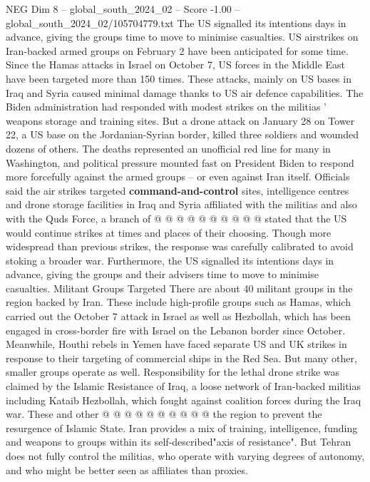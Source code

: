 \begin{textsample}{NEG Dim 8 – global\_south\_2024\_02 – Score -1.00 – global\_south\_2024\_02/105704779.txt}  \label{ex:f8_neg_063}
The US signalled its intentions days in advance, giving the groups time to move to minimise casualties.
US airstrikes on Iran-backed armed groups on February 2 have been anticipated for some time.
Since the Hamas attacks in Israel on October 7, US forces in the Middle East have been targeted more than 150 times.
These attacks, mainly on US bases in Iraq and Syria caused minimal damage thanks to US air defence capabilities.
The Biden administration had responded with modest strikes on the militias ' weapons storage and training sites.
But a drone attack on January 28 on Tower 22, a US base on the Jordanian-Syrian border, killed three soldiers and wounded dozens of others.
The deaths represented an unofficial red line for many in Washington, and political pressure mounted fast on President Biden to respond more forcefully against the armed groups -- or even against Iran itself.
Officials said the air strikes targeted \textbf{command-and-control} sites, intelligence centres and drone storage facilities in Iraq and Syria affiliated with the militias and also with the Quds Force, a branch of @ @ @ @ @ @ @ @ @ @ stated that the US would continue strikes at times and places of their choosing.
Though more widespread than previous strikes, the response was carefully calibrated to avoid stoking a broader war.
Furthermore, the US signalled its intentions days in advance, giving the groups and their advisers time to move to minimise casualties.
Militant Groups Targeted There are about 40 militant groups in the region backed by Iran.
These include high-profile groups such as Hamas, which carried out the October 7 attack in Israel as well as Hezbollah, which has been engaged in cross-border fire with Israel on the Lebanon border since October.
Meanwhile, Houthi rebels in Yemen have faced separate US and UK strikes in response to their targeting of commercial ships in the Red Sea.
But many other, smaller groups operate as well.
Responsibility for the lethal drone strike was claimed by the Islamic Resistance of Iraq, a loose network of Iran-backed militias including Kataib Hezbollah, which fought against coalition forces during the Iraq war.
These and other @ @ @ @ @ @ @ @ @ @ the region to prevent the resurgence of Islamic State.
Iran provides a mix of training, intelligence, funding and weapons to groups within its self-described"axis of resistance".
But Tehran does not fully control the militias, who operate with varying degrees of autonomy, and who might be better seen as affiliates than proxies.

\end{textsample}
